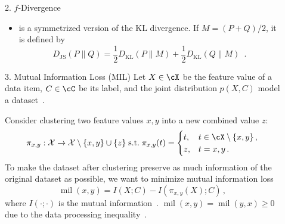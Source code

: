 \documentclass[final]{beamer}
\DeclareMathOperator{\mil}{mil}
\newcommand{\kl}[2]{D_{\mathrm{KL}}( #1 \parallel #2 )}
\newcommand{\js}[2]{D_{\mathrm{JS}}( #1 \parallel #2 )}
\newlength{\sepwid}
\newlength{\onecolwid}
\begin{document}
\begin{frame}[t]
\begin{columns}[t]
\begin{column}{\onecolwid}
\begin{block}{2. $ f $-Divergence}
\begin{itemize}
		\item {}
			 is a symmetrized version 
			of the 
			KL divergence. If 
			 $ M=(P+Q)/2 $, it 
			is defined by
			\begin{equation}\label{eq:jensen-shannon}
			\js{P}{Q} = \frac{1}{2} \kl{P}{M} + \frac{1}{2} \kl{Q}{M}\enspace.
			\end{equation}
\end{itemize}
	\end{block}
	\begin{block}{3. Mutual Information Loss (MIL)}
		Let $ X\in \cX $ be the feature value of a data item, $ C\in \cC $ be 
		its 
		label, and the joint distribution $ p(X,C) $ model a 
		dataset~\citep{bateni2019categorical}.
		
		Consider clustering two feature values $ x,y $ into a new combined 
		value $ 
		z $:
		\[ 
		\pi_{x,y}: \mathcal{X}\to \mathcal{X}\setminus\{x,y\}\cup 
		\{z\}\;\text{s.t.}\; \pi_{x,y}(t) = \begin{cases}
		t, & t\in \cX\setminus \{x, y\}\,,\\
		z, & t = x,y\,.
		\end{cases}
		\]
		To make the dataset after clustering
		preserve as much information of the original dataset as 
		possible, 
		we want to minimize
		 mutual 
		information loss 
		\[\mil(x,y) = I(X;C) - I(\pi_{x,y}(X);C)\,,\]
		where $I(\cdot;\cdot)$ is the mutual 
		information~\cite{cover2012elements}.
		$ \mil(x,y)=\mil(y,x)\ge 0 $ due to the data processing 
		inequality~\cite{cover2012elements}.
	\end{block}
		\end{column} %
 		\begin{column}{\sepwid}\end{column} %
\begin{column}{\onecolwid} %
\vspace{-40pt}


\end{column}
\end{columns}
\end{frame}
\end{document}
